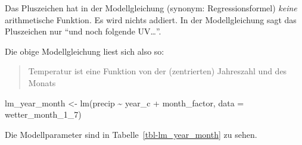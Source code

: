 \documentclass[
  letterpaper,
  twoside,
  open=any]{scrbook}
\newenvironment{Shaded}{\begin{snugshade}}{\end{snugshade}}
\newcommand{\AttributeTok}[1]{\textcolor[rgb]{0.40,0.45,0.13}{#1}}
\newcommand{\FunctionTok}[1]{\textcolor[rgb]{0.28,0.35,0.67}{#1}}
\newcommand{\NormalTok}[1]{\textcolor[rgb]{0.00,0.23,0.31}{#1}}
\newcommand{\OtherTok}[1]{\textcolor[rgb]{0.00,0.23,0.31}{#1}}
\newcommand{\SpecialCharTok}[1]{\textcolor[rgb]{0.37,0.37,0.37}{#1}}
\theoremstyle{definition}
\theoremstyle{definition}
\theoremstyle{definition}
\theoremstyle{remark}
\begin{document}
Das Pluszeichen hat in der Modellgleichung (synonym: Regressionsformel)
\emph{keine} arithmetische Funktion. Es wird nichts addiert. In der
Modellgleichung sagt das Pluszeichen nur \enquote{und noch folgende
UV\ldots{}}.

Die obige Modellgleichung liest sich also so:

\begin{quote}
Temperatur ist eine Funktion von der (zentrierten) Jahreszahl und des
Monats
\end{quote}

\begin{Shaded}
\begin{Highlighting}[]
\NormalTok{lm\_year\_month }\OtherTok{\textless{}{-}} \FunctionTok{lm}\NormalTok{(precip }\SpecialCharTok{\textasciitilde{}}\NormalTok{ year\_c }\SpecialCharTok{+}\NormalTok{ month\_factor, }
                    \AttributeTok{data =}\NormalTok{ wetter\_month\_1\_7)}
\end{Highlighting}
\end{Shaded}

Die Modellparameter sind in Tabelle~\ref{tbl-lm_year_month} zu sehen.
\end{document}
